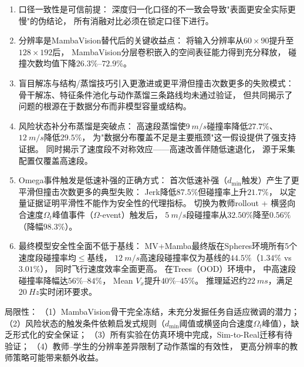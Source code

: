 \begin{enumerate}
  \item 口径一致性是可信前提：
    深度归一化口径的不一致会导致"表面更安全实际更慢"的伪结论，
    所有消融对比必须在锁定口径下进行。

  \item 分辨率是MambaVision替代后的关键收益点：
    将输入分辨率从$60\times90$提升至$128\times192$后，
    MambaVision分层卷积嵌入的空间表征能力得到充分释放，
    碰撞次数均值下降$26.3\%$--$72.9\%$。

  \item 盲目解冻与结构/蒸馏技巧引入更激进或更平滑但撞击次数更多的失败模式：
    骨干解冻、特征条件池化与动作蒸馏三条路线均未通过验证，
    但共同揭示了问题的根源在于数据分布而非模型容量或结构。

  \item 风险状态补分布蒸馏是突破点：
    高速段蒸馏使$\SI{9}{m/s}$碰撞率降低$27.7\%$、$\SI{12}{m/s}$降低$29.5\%$，
    为"数据分布覆盖不足是主要瓶颈"这一假设提供了强支持证据。
    同时揭示了速度段不对称效应——高速改善伴随低速退化，
    源于采集配置仅覆盖高速段。

  \item Omega事件触发是低速补强的正确方式：
    首次低速补强（$d_{\min}$触发）产生了更平滑但撞击次数更多的典型失败：
    Jerk降低$87.5\%$但碰撞率上升$21.7\%$，
    以定量证据证明平滑性不能作为安全性的代理指标。
    切换为教师rollout + 横竖向合速度$\Omega_t$峰值事件（$\Omega$-event）触发后，
    $\SI{5}{m/s}$段碰撞率从$32.50\%$降至$0.56\%$（降幅$98.3\%$）。

  \item 最终模型安全性全面不低于基线：
    MV+Mamba最终版在Spheres环境所有5个速度段碰撞率均$\leq$基线，
    $\SI{12}{m/s}$高速段碰撞率仅为基线的$44.5\%$（$1.34\%$ vs $3.01\%$），
    同时飞行速度效率全面更高。
    在Trees（OOD）环境中，
    中高速段碰撞率降幅达$56\%$--$84\%$，
    Mean $V_x$提升$40\%$--$45\%$。
    推理延迟约$\SI{22}{ms}$，满足$\SI{20}{Hz}$实时闭环要求。
\end{enumerate}

局限性：
（1）MambaVision骨干完全冻结，未充分发掘任务自适应微调的潜力；
（2）风险状态的触发条件依赖启发式规则（$d_{\min}$阈值或横竖向合速度$\Omega_t$峰值），缺乏形式化的安全保证；
（3）所有实验在仿真环境中完成，Sim-to-Real迁移有待验证；
（4）教师--学生的分辨率差异限制了动作蒸馏的有效性，
更高分辨率的教师策略可能带来额外收益。
